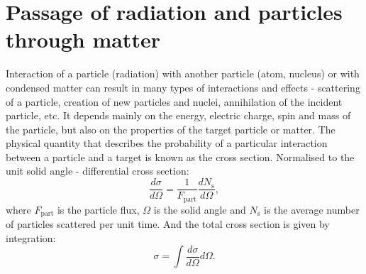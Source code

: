 \section{Passage of radiation and particles through matter}
Interaction of a particle (radiation) with another particle (atom, nucleus) or with condensed matter can result in many types of interactions and effects - scattering of a particle, creation of new particles and nuclei, annihilation of the incident particle, etc. It depends mainly on the energy, electric charge, spin and mass of the particle, but also on the properties of the target particle or matter. The physical quantity that describes the probability of a particular interaction between a particle and a target is known as the cross section. Normalised to the unit solid angle - differential cross section:
 \begin{equation}
\frac{d\sigma}{d\Omega} = \frac{1}{F_{\textrm{part}}} \frac{dN_\textrm{s}}{d\Omega},
 \end{equation}
where $F_{\textrm{part}}$ is the particle flux, $\Omega$ is the solid angle and $N_\textrm{s}$ is the average number of particles scattered per unit time. And the total cross section is given by integration:
  \begin{equation}
 \sigma = \int \frac{d\sigma}{d\Omega} d\Omega.
 \end{equation}


